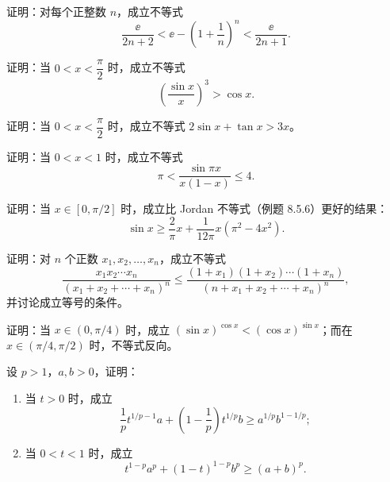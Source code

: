 \begin{xreferenceproblem}[6]
证明：对每个正整数 $n$，成立不等式
  \[
    \frac{\ee}{2n+2}<\ee-\left(1+\frac1n\right)^n<\frac{\ee}{2n+1}.
  \]
\end{xreferenceproblem}

\begin{xreferenceproblem}[7]
证明：当 $0<x<\dfrac\pi2$ 时，成立不等式
  \[
    \left(\frac{\sin x}{x}\right)^3>\cos x.
  \]
\end{xreferenceproblem}

\begin{xreferenceproblem}[8]
证明：当 $0<x<\dfrac\pi2$ 时，成立不等式 $2\sin x+\tan x>3x$。
\end{xreferenceproblem}

\begin{xreferenceproblem}[9]
证明：当 $0<x<1$ 时，成立不等式
  \[
    \pi<\frac{\sin\pi x}{x(1-x)}\le4.
  \]
\end{xreferenceproblem}

\begin{xreferenceproblem}[10]
证明：当 $x\in[0,\pi/2]$ 时，成立比 Jordan 不等式（例题 8.5.6）更好的结果：
  \[
    \sin x\ge\frac2\pi x+\frac1{12\pi}x(\pi^2-4x^2).
  \]
\end{xreferenceproblem}

\begin{xreferenceproblem}[11]
证明：对 $n$ 个正数 $x_1,x_2,\ldots,x_n$，成立不等式
  \[
    \frac{x_1x_2\cdots x_n}{(x_1+x_2+\cdots+x_n)^n}
    \le
    \frac{(1+x_1)(1+x_2)\cdots(1+x_n)}{(n+x_1+x_2+\cdots+x_n)^n},
  \]
  并讨论成立等号的条件。
\end{xreferenceproblem}

\begin{xreferenceproblem}[12]
证明：当 $x\in(0,\pi/4)$ 时，成立 $(\sin x)^{\cos x}<(\cos x)^{\sin x}$；而在 $x\in(\pi/4,\pi/2)$ 时，不等式反向。
\end{xreferenceproblem}

\begin{xreferenceproblem}[13]
设 $p>1$，$a,b>0$，证明：
  \begin{enumerate}[label=(\arabic*)]
    \item 当 $t>0$ 时，成立
    \[
      \frac1p t^{1/p-1}a+\left(1-\frac1p\right)t^{1/p}b
      \ge a^{1/p}b^{1-1/p};
    \]
    \item 当 $0<t<1$ 时，成立
    \[
      t^{1-p}a^p+(1-t)^{1-p}b^p\ge(a+b)^p.
    \]
  \end{enumerate}
\end{xreferenceproblem}

